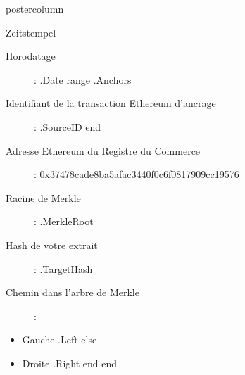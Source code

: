 \documentclass[roundedcorners=true, titleposition=center]{beamerthemeruhuisstijlposter}
\begin{document}
\begin{frame}
\begin{columns}
\begin{column}{0.95\textwidth}
\begin{beamercolorbox}[center, wd=\textwidth]{postercolumn}
\begin{minipage}[T]{0.95\textwidth}
    \hfill
\parbox[t][\columnheight]{\textwidth}{%

\begin{block}{Zeitstempel}
\begin{description}
\item [Horodatage] :\linebreak
{{ .Date }}
{{ range .Anchors }}
\item [Identifiant de la transaction Ethereum d’ancrage] :\linebreak
\href{https://etherscan.io/tx/{{ .SourceID }} }{ {{.SourceID }} }
{{ end }}
\item[Adresse Ethereum du Registre du Commerce] :\linebreak
0x37478cade8ba5afac3440f0c6f0817909cc19576
\item[Racine de Merkle] :\linebreak
{{ .MerkleRoot }}
\item[Hash de votre extrait] :\linebreak
{{ .TargetHash }}
\item[Chemin dans l’arbre de Merkle] :
\end{description}
\begin{itemize}
{{ range .Proof }}
    {{ if .Left }}
        \item Gauche {{ .Left }}
    {{ else }}
        \item Droite {{ .Right }}
    {{ end }}
{{ end }}
\end{itemize}
\end{block}
}
\end{minipage}
\end{beamercolorbox}
\end{column}
\end{columns}
\end{frame}
\end{document}
